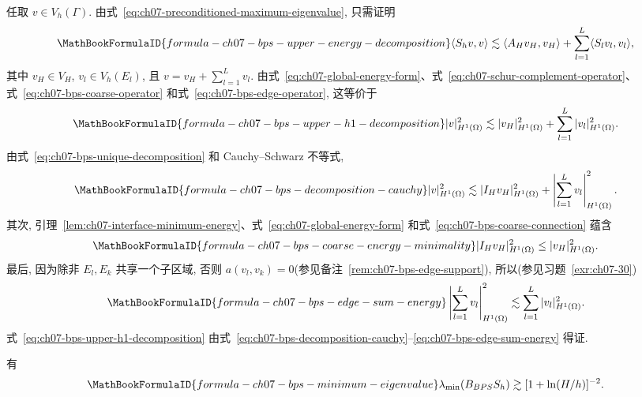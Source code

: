 \begin{Proof}
任取 $v\in V_h(\Gamma)$. 由式~\eqref{eq:ch07-preconditioned-maximum-eigenvalue}, 只需证明
\[
\MathBookFormulaID{formula-ch07-bps-upper-energy-decomposition}
\langle S_hv,v\rangle
\lesssim\langle A_Hv_H,v_H\rangle
+\sum_{l=1}^{L}\langle S_lv_l,v_l\rangle,
\]
其中 $v_H\in V_H$, $v_l\in V_h(E_l)$, 且 $v=v_H+\sum_{l=1}^{L}v_l$. 由式~\eqref{eq:ch07-global-energy-form}、式~\eqref{eq:ch07-schur-complement-operator}、式~\eqref{eq:ch07-bps-coarse-operator} 和式~\eqref{eq:ch07-bps-edge-operator}, 这等价于
\begin{equation}
\MathBookFormulaID{formula-ch07-bps-upper-h1-decomposition}
\label{eq:ch07-bps-upper-h1-decomposition}
|v|_{H^1(\Omega)}^2
\lesssim|v_H|_{H^1(\Omega)}^2
+\sum_{l=1}^{L}|v_l|_{H^1(\Omega)}^2.
\end{equation}
由式~\eqref{eq:ch07-bps-unique-decomposition} 和 Cauchy--Schwarz 不等式,
\begin{equation}
\MathBookFormulaID{formula-ch07-bps-decomposition-cauchy}
\label{eq:ch07-bps-decomposition-cauchy}
|v|_{H^1(\Omega)}^2
\lesssim|I_Hv_H|_{H^1(\Omega)}^2
+\left|\sum_{l=1}^{L}v_l\right|_{H^1(\Omega)}^2.
\end{equation}
其次, 引理~\ref{lem:ch07-interface-minimum-energy}、式~\eqref{eq:ch07-global-energy-form} 和式~\eqref{eq:ch07-bps-coarse-connection} 蕴含
\begin{equation}
\MathBookFormulaID{formula-ch07-bps-coarse-energy-minimality}
\label{eq:ch07-bps-coarse-energy-minimality}
|I_Hv_H|_{H^1(\Omega)}^2\leq|v_H|_{H^1(\Omega)}^2.
\end{equation}
最后, 因为除非 $E_l,E_k$ 共享一个子区域, 否则 $a(v_l,v_k)=0$(参见备注~\ref{rem:ch07-bps-edge-support}), 所以(参见习题~\ref{exr:ch07-30})
\begin{equation}
\MathBookFormulaID{formula-ch07-bps-edge-sum-energy}
\label{eq:ch07-bps-edge-sum-energy}
\left|\sum_{l=1}^{L}v_l\right|_{H^1(\Omega)}^2
\lesssim\sum_{l=1}^{L}|v_l|_{H^1(\Omega)}^2.
\end{equation}
式~\eqref{eq:ch07-bps-upper-h1-decomposition} 由式~\eqref{eq:ch07-bps-decomposition-cauchy}--\eqref{eq:ch07-bps-edge-sum-energy} 得证.
\end{Proof}

\begin{Lemma}
\label{lem:ch07-bps-minimum-eigenvalue}
有
\[
\MathBookFormulaID{formula-ch07-bps-minimum-eigenvalue}
\lambda_{\min}(B_{BPS}S_h)
\gtrsim[1+\ln(H/h)]^{-2}.
\]
\end{Lemma}

